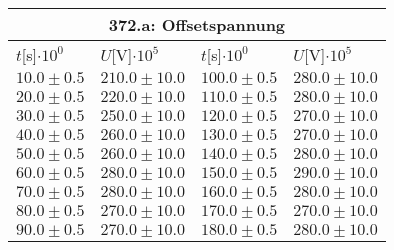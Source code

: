 \documentclass{article}
\begin{document}
\begin{tabular}{|p{3cm}|p{3cm}||p{3cm}|p{3cm}|}
\hline
\multicolumn{4}{|c|}{372.a: Offsetspannung}\\
\hline
$t$[s]$\cdot 10^{0}$&$U$[V]$\cdot 10^{5}$&$t$[s]$\cdot 10^{0}$&$U$[V]$\cdot 10^{5}$\\
\hline
$10.0\pm0.5$&$210.0\pm 10.0$&$100.0\pm0.5$&$280.0\pm 10.0$\\
$20.0\pm0.5$&$220.0\pm 10.0$&$110.0\pm0.5$&$280.0\pm 10.0$\\
$30.0\pm0.5$&$250.0\pm 10.0$&$120.0\pm0.5$&$270.0\pm 10.0$\\
$40.0\pm0.5$&$260.0\pm 10.0$&$130.0\pm0.5$&$270.0\pm 10.0$\\
$50.0\pm0.5$&$260.0\pm 10.0$&$140.0\pm0.5$&$280.0\pm 10.0$\\
$60.0\pm0.5$&$280.0\pm 10.0$&$150.0\pm0.5$&$290.0\pm 10.0$\\
$70.0\pm0.5$&$280.0\pm 10.0$&$160.0\pm0.5$&$280.0\pm 10.0$\\
$80.0\pm0.5$&$270.0\pm 10.0$&$170.0\pm0.5$&$270.0\pm 10.0$\\
$90.0\pm0.5$&$270.0\pm 10.0$&$180.0\pm0.5$&$280.0\pm 10.0$\\
\hline
\end{tabular}
\end{document}
